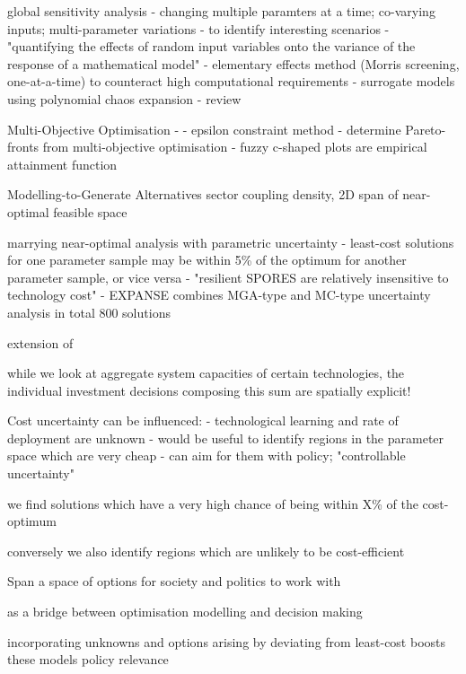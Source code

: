 global sensitivity analysis
- changing multiple paramters at a time; co-varying inputs; multi-parameter variations
- to identify interesting scenarios \cite{usher_value_2015}
- "quantifying the effects of random input variables onto the variance of the response of a mathematical model" \cite{sudret_global_2008}
- elementary effects method (Morris screening, one-at-a-time) to counteract high computational requirements \cite{usher_value_2015} \cite{pizarro-alonso_uncertainties_2019} \cite{moret_robust_2016}
- surrogate models using polynomial chaos expansion
- review \cite{iooss_review_2014}

Multi-Objective Optimisation
- \cite{nearoptimal}
- epsilon constraint method
- determine Pareto-fronts from multi-objective optimisation \cite{mavrotas_effective_2009}
- fuzzy c-shaped plots are empirical attainment function \cite{binois_quantifying_2015} \cite{de_cursi_uncertainty_2021}

Modelling-to-Generate Alternatives
\cite{DeCarolis2016}
\cite{Price2017}
\cite{nacken_integrated_2019} sector coupling
\cite{pedersen_modeling_2020} density, 2D span of near-optimal feasible space


marrying near-optimal analysis with parametric uncertainty
- least-cost solutions for one parameter sample may be within 5\% of the optimum for another parameter sample, or vice versa
- "resilient SPORES are relatively insensitive to technology cost" \cite{lombardi_policy_2020}
- EXPANSE combines MGA-type and MC-type uncertainty analysis in total 800 solutions \cite{Li2017} \cite{Trutnevyte2013}


extension of \cite{nearoptimal}

while we look at aggregate system capacities of certain technologies, the individual investment decisions composing this sum are spatially explicit!

Cost uncertainty can be influenced:
- technological learning and rate of deployment are unknown
- would be useful to identify regions in the parameter space which are very cheap
- can aim for them with policy; "controllable uncertainty"

we find solutions which have a very high chance of being within X\% of the cost-optimum

conversely we also identify regions which are unlikely to be cost-efficient

Span a space of options for society and politics to work with

as a bridge between optimisation modelling and decision making

incorporating unknowns and options arising by deviating from least-cost
boosts these models policy relevance

